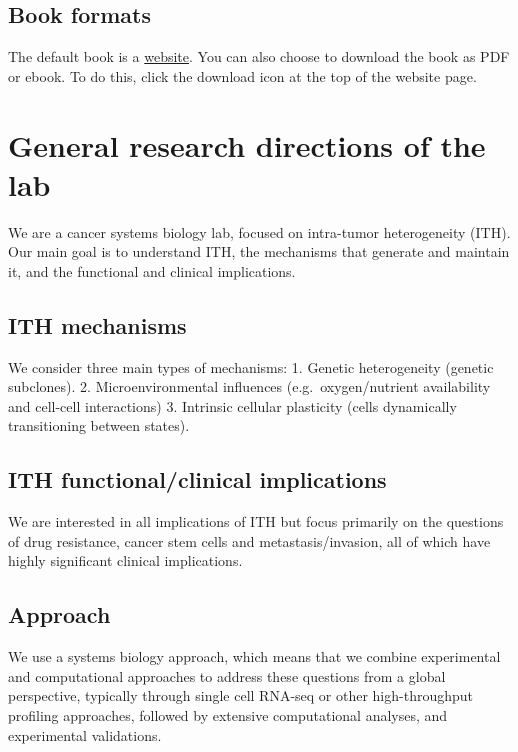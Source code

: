 \documentclass[
]{book}
\begin{document}
\hypertarget{book-formats}{%
\section{Book formats}\label{book-formats}}

The default book is a \href{https://tiroshlab.github.io/lab-book}{website}. You can also choose to download the book as PDF or ebook. To do this, click the download icon at the top of the website page.

\hypertarget{general}{%
\chapter{General research directions of the lab}\label{general}}

We are a cancer systems biology lab, focused on intra-tumor heterogeneity (ITH). Our main goal is to understand ITH, the mechanisms that generate and maintain it, and the functional and clinical implications.

\hypertarget{ith-mechanisms}{%
\section{ITH mechanisms}\label{ith-mechanisms}}

We consider three main types of mechanisms:
1. Genetic heterogeneity (genetic subclones).
2. Microenvironmental influences (e.g.~oxygen/nutrient availability and cell-cell interactions)
3. Intrinsic cellular plasticity (cells dynamically transitioning between states).

\hypertarget{ith-functionalclinical-implications}{%
\section{ITH functional/clinical implications}\label{ith-functionalclinical-implications}}

We are interested in all implications of ITH but focus primarily on the questions of drug resistance, cancer stem cells and metastasis/invasion, all of which have highly significant clinical implications.

\hypertarget{approach}{%
\section{Approach}\label{approach}}

We use a systems biology approach, which means that we combine experimental and computational approaches to address these questions from a global perspective, typically through single cell RNA-seq or other high-throughput profiling approaches, followed by extensive computational analyses, and experimental validations.
\end{document}
